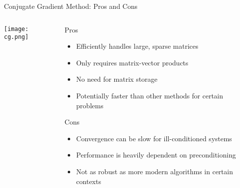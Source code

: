 \documentclass{beamer}
\begin{document}
\begin{frame}{Conjugate Gradient Method: Pros and Cons}
  \begin{columns}[T] 
    \begin{column}{0.5\textwidth}
      \texttt{[image: cg.png]}
    \end{column}

    \begin{column}{0.5\textwidth}
      \footnotesize 
      \begin{block}{Pros}
        \begin{itemize}
          \item Efficiently handles large, sparse matrices
          \item Only requires matrix-vector products
          \item No need for matrix storage
          \item Potentially faster than other methods for certain problems
        \end{itemize}
      \end{block}

      \begin{block}{Cons}
        \begin{itemize}
          \item Convergence can be slow for ill-conditioned systems
          \item Performance is heavily dependent on preconditioning
          \item Not as robust as more modern algorithms in certain contexts
        \end{itemize}
      \end{block}
      \normalsize
    \end{column}
  \end{columns}
\end{frame}
\end{document}
